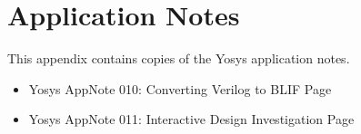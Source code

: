 
\chapter{Application Notes}
\label{chapter:appnotes}

% 

This appendix contains copies of the Yosys application notes.

\begin{itemize}
\item Yosys AppNote 010: Converting Verilog to BLIF \dotfill Page \pageref{app:010} \hskip2cm\null
\item Yosys AppNote 011: Interactive Design Investigation \dotfill Page \pageref{app:011} \hskip2cm\null
\end{itemize}

\eject\label{app:010}


\eject\label{app:011}


